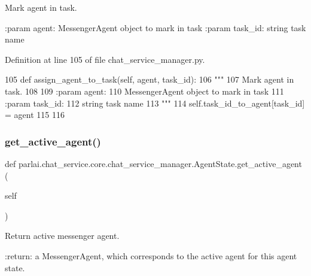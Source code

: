 \begin{DoxyVerb}Mark agent in task.

:param agent:
    MessengerAgent object to mark in task
:param task_id:
    string task name
\end{DoxyVerb}
 

Definition at line 105 of file chat\+\_\+service\+\_\+manager.\+py.


\begin{DoxyCode}
105     \textcolor{keyword}{def }assign\_agent\_to\_task(self, agent, task\_id):
106         \textcolor{stringliteral}{"""}
107 \textcolor{stringliteral}{        Mark agent in task.}
108 \textcolor{stringliteral}{}
109 \textcolor{stringliteral}{        :param agent:}
110 \textcolor{stringliteral}{            MessengerAgent object to mark in task}
111 \textcolor{stringliteral}{        :param task\_id:}
112 \textcolor{stringliteral}{            string task name}
113 \textcolor{stringliteral}{        """}
114         self.task\_id\_to\_agent[task\_id] = agent
115 
116 
\end{DoxyCode}
\mbox{\label{classparlai_1_1chat__service_1_1core_1_1chat__service__manager_1_1AgentState_a7f50564fa800017500730abdc36a6cbc}} 
\subsubsection{\texorpdfstring{get\+\_\+active\+\_\+agent()}{get\_active\_agent()}}
{\footnotesize\ttfamily def parlai.\+chat\+\_\+service.\+core.\+chat\+\_\+service\+\_\+manager.\+Agent\+State.\+get\+\_\+active\+\_\+agent (\begin{DoxyParamCaption}\item[{}]{self }\end{DoxyParamCaption})}

\begin{DoxyVerb}Return active messenger agent.

:return:
    a MessengerAgent, which corresponds to the active agent for this
    agent state.
\end{DoxyVerb}
 

